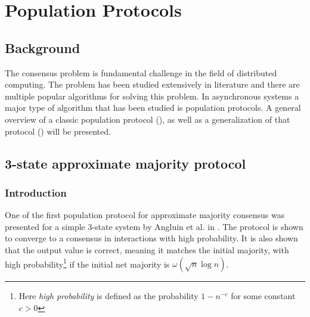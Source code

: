 \section{Population Protocols} \label{Section3}
\subsection{Background}

The consensus problem is fundamental challenge in the field of distributed computing. The problem has been studied extensively in literature and there are multiple popular algorithms for solving this problem. In asynchronous systems a major type of algorithm that has been studied is population protocols. A general overview of a classic population protocol (\cite{angluinSimplePopulationProtocol2008}), as well as a generalization of that protocol (\cite{AspnesFastConverganceOfKOpinion2023}) will be presented. 


\subsection{3-state approximate majority protocol} \label{3stateApproximatemajority}
\subsubsection{Introduction} \label{angluinIntroduction}

One of the first population protocol for approximate majority consensus was presented for a simple 3-state system by Angluin et al. in \cite{angluinSimplePopulationProtocol2008}. The protocol is shown to converge to a consensus in  interactions with high probability. It is also shown that the output value is correct, meaning it matches the initial majority, with high probability\footnote{Here \emph{high probability} is defined as the probability $1 - n^{-c}$ for some constant $c > 0$} if the initial net majority is $\omega(\sqrt{n} \log n)$.

